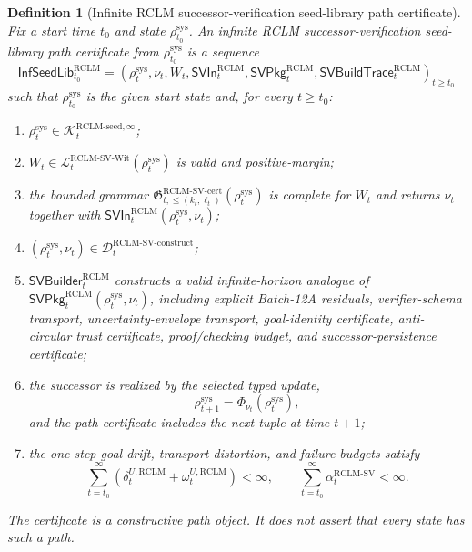 \documentclass[11pt,a4paper]{article}
\newtheorem{definition}[theorem]{Definition}
\newcommand{\Lcal}{\mathcal L}
\newcommand{\Kcal}{\mathcal K}
\newcommand{\Dcal}{\mathcal D}
\newcommand{\RCLM}{\mathrm{RCLM}}
\newcommand{\sys}{\mathrm{sys}}
\begin{document}
\begin{definition}[Infinite RCLM successor-verification seed-library path certificate]
\label{def:rclm-batch12b-infinite-sv-seedlib-path-certificate}
Fix a start time \(t_0\) and state \(\rho_{t_0}^{\sys}\). An infinite RCLM successor-verification seed-library path certificate from \(\rho_{t_0}^{\sys}\) is a sequence
\[
\mathsf{InfSeedLib}_{t_0}^{\RCLM}
=
(\rho_t^{\sys},\nu_t,W_t,\mathsf{SVIn}_t^{\RCLM},\mathsf{SVPkg}_t^{\RCLM},\mathsf{SVBuildTrace}_t^{\RCLM})_{t\ge t_0}
\]
such that \(\rho_{t_0}^{\sys}\) is the given start state and, for every \(t\ge t_0\):
\begin{enumerate}[label=(\roman*),leftmargin=1.5em]
    \item \(\rho_t^{\sys}\in\Kcal_t^{\RCLM\text{-}\mathrm{seed},\infty}\);
    \item \(W_t\in\Lcal_t^{\RCLM\text{-}\mathrm{SV\mbox{-}Wit}}(\rho_t^{\sys})\) is valid and positive-margin;
    \item the bounded grammar \(\mathfrak G_{t,\le(k_t,\ell_t)}^{\RCLM\text{-}\mathrm{SV\mbox{-}cert}}(\rho_t^{\sys})\) is complete for \(W_t\) and returns \(\nu_t\) together with \(\mathsf{SVIn}_t^{\RCLM}(\rho_t^{\sys},\nu_t)\);
    \item \((\rho_t^{\sys},\nu_t)\in\Dcal_t^{\RCLM\text{-}\mathrm{SV\mbox{-}construct}}\);
    \item \(\mathsf{SVBuilder}_t^{\RCLM}\) constructs a valid infinite-horizon analogue of \(\mathsf{SVPkg}_t^{\RCLM}(\rho_t^{\sys},\nu_t)\), including explicit Batch-12A residuals, verifier-schema transport, uncertainty-envelope transport, goal-identity certificate, anti-circular trust certificate, proof/checking budget, and successor-persistence certificate;
    \item the successor is realized by the selected typed update,
    \[
    \rho_{t+1}^{\sys}=\Phi_{\nu_t}(\rho_t^{\sys}),
    \]
    and the path certificate includes the next tuple at time \(t+1\);
    \item the one-step goal-drift, transport-distortion, and failure budgets satisfy
    \[
    \sum_{t=t_0}^{\infty}(\delta_t^{U,\RCLM}+\omega_t^{U,\RCLM})<\infty,
    \qquad
    \sum_{t=t_0}^{\infty}\alpha_t^{\RCLM\text{-}\mathrm{SV}}<\infty.
    \]
\end{enumerate}
The certificate is a constructive path object. It does not assert that every state has such a path.
\end{definition}
\end{document}
